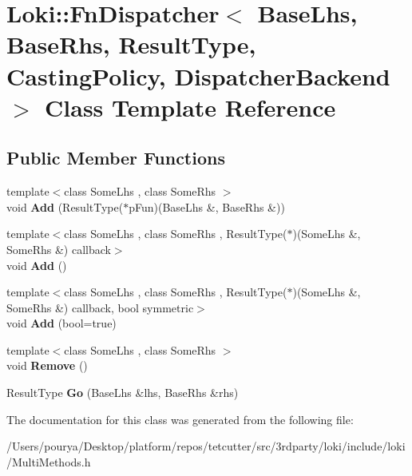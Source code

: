 \hypertarget{classLoki_1_1FnDispatcher}{}\section{Loki\+:\+:Fn\+Dispatcher$<$ Base\+Lhs, Base\+Rhs, Result\+Type, Casting\+Policy, Dispatcher\+Backend $>$ Class Template Reference}
\label{classLoki_1_1FnDispatcher}
\subsection*{Public Member Functions}
\begin{DoxyCompactItemize}
\item 
\hypertarget{classLoki_1_1FnDispatcher_aa3c3785209c80608efc4eb7c2547a73e}{}{\footnotesize template$<$class Some\+Lhs , class Some\+Rhs $>$ }\\void {\bfseries Add} (Result\+Type($\ast$p\+Fun)(Base\+Lhs \&, Base\+Rhs \&))\label{classLoki_1_1FnDispatcher_aa3c3785209c80608efc4eb7c2547a73e}

\item 
\hypertarget{classLoki_1_1FnDispatcher_a721cad96dfc58e82302638bd98e38770}{}{\footnotesize template$<$class Some\+Lhs , class Some\+Rhs , Result\+Type($\ast$)(\+Some\+Lhs \&, Some\+Rhs \&) callback$>$ }\\void {\bfseries Add} ()\label{classLoki_1_1FnDispatcher_a721cad96dfc58e82302638bd98e38770}

\item 
\hypertarget{classLoki_1_1FnDispatcher_a7e2dcce8f48c7213718eb859f2b81c3c}{}{\footnotesize template$<$class Some\+Lhs , class Some\+Rhs , Result\+Type($\ast$)(\+Some\+Lhs \&, Some\+Rhs \&) callback, bool symmetric$>$ }\\void {\bfseries Add} (bool=true)\label{classLoki_1_1FnDispatcher_a7e2dcce8f48c7213718eb859f2b81c3c}

\item 
\hypertarget{classLoki_1_1FnDispatcher_aa2ab01590f5d3e1ae466766e95013bcc}{}{\footnotesize template$<$class Some\+Lhs , class Some\+Rhs $>$ }\\void {\bfseries Remove} ()\label{classLoki_1_1FnDispatcher_aa2ab01590f5d3e1ae466766e95013bcc}

\item 
\hypertarget{classLoki_1_1FnDispatcher_a4748ff463fd139b845e5ce68e0a500bc}{}Result\+Type {\bfseries Go} (Base\+Lhs \&lhs, Base\+Rhs \&rhs)\label{classLoki_1_1FnDispatcher_a4748ff463fd139b845e5ce68e0a500bc}

\end{DoxyCompactItemize}


The documentation for this class was generated from the following file\+:\begin{DoxyCompactItemize}
\item 
/\+Users/pourya/\+Desktop/platform/repos/tetcutter/src/3rdparty/loki/include/loki/Multi\+Methods.\+h\end{DoxyCompactItemize}
